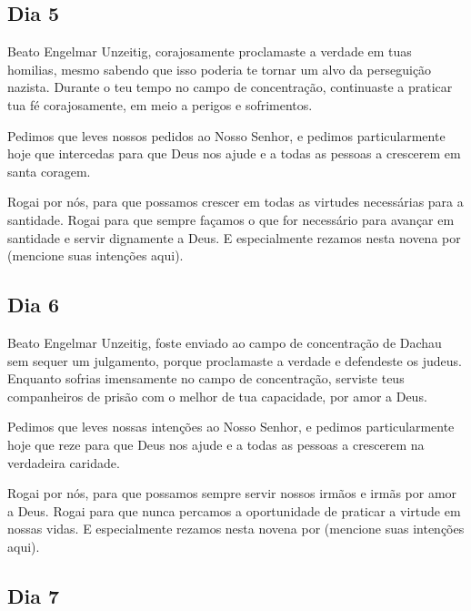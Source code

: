 \documentclass[a4paper,14pt]{extarticle} \usepackage[utf8]{inputenc}
\begin{document}
\underline{}

\subsection{Dia 5}

\underline{}

Beato Engelmar Unzeitig, corajosamente proclamaste a verdade em tuas homilias, mesmo sabendo que isso poderia te tornar um alvo da perseguição nazista. Durante o teu tempo no campo de concentração, continuaste a praticar tua fé corajosamente, em meio a perigos e sofrimentos.

Pedimos que leves nossos pedidos ao Nosso Senhor, e pedimos particularmente hoje que intercedas para que Deus nos ajude e a todas as pessoas a crescerem em santa coragem. 

Rogai por nós, para que possamos crescer em todas as virtudes necessárias para a santidade. Rogai para que sempre façamos o que for necessário para avançar em santidade e servir dignamente a Deus. E especialmente rezamos nesta novena por (mencione suas intenções aqui).


\underline{}

\subsection{Dia 6}

\underline{}

Beato Engelmar Unzeitig, foste enviado ao campo de concentração de Dachau sem sequer um julgamento, porque proclamaste a verdade e defendeste os judeus. Enquanto sofrias imensamente no campo de concentração, serviste teus companheiros de prisão com o melhor de tua capacidade, por amor a Deus.

Pedimos que leves nossas intenções ao Nosso Senhor, e pedimos particularmente hoje que reze para que Deus nos ajude e a todas as pessoas a crescerem na verdadeira caridade. 

Rogai por nós, para que possamos sempre servir nossos irmãos e irmãs por amor a Deus. Rogai para que nunca percamos a oportunidade de praticar a virtude em nossas vidas. E especialmente rezamos nesta novena por (mencione suas intenções aqui).


\underline{}

\subsection{Dia 7}
\end{document}
